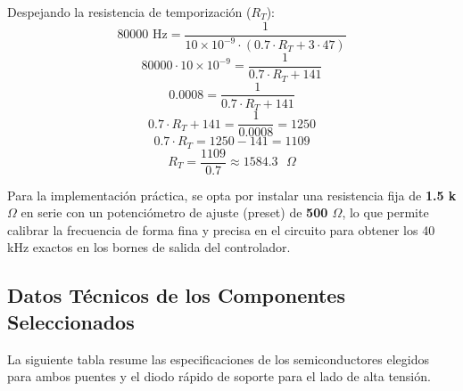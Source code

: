 \documentclass[11pt, a4paper]{article}
\begin{document}
Despejando la resistencia de temporización ($R_T$):
$$80000\text{ Hz} = \frac{1}{10 \times 10^{-9} \cdot (0.7 \cdot R_T + 3 \cdot 47)}$$
$$80000 \cdot 10 \times 10^{-9} = \frac{1}{0.7 \cdot R_T + 141}$$
$$0.0008 = \frac{1}{0.7 \cdot R_T + 141}$$
$$0.7 \cdot R_T + 141 = \frac{1}{0.0008} = 1250$$
$$0.7 \cdot R_T = 1250 - 141 = 1109$$
$$R_T = \frac{1109}{0.7} \approx 1584.3\text{ }\Omega$$

Para la implementación práctica, se opta por instalar una resistencia fija de \textbf{1.5 k$\Omega$} en serie con un potenciómetro de ajuste (preset) de \textbf{500 $\Omega$}, lo que permite calibrar la frecuencia de forma fina y precisa en el circuito para obtener los 40 kHz exactos en los bornes de salida del controlador.

\newpage
\subsection{Datos Técnicos de los Componentes Seleccionados}

La siguiente tabla resume las especificaciones de los semiconductores elegidos para ambos puentes y el diodo rápido de soporte para el lado de alta tensión.

\begin{table}[H]
\centering
\caption{Especificaciones técnicas de los MOSFETs seleccionados para el convertidor DAB.}
\label{tab:mosfets_specs}
\end{table}
\end{document}
